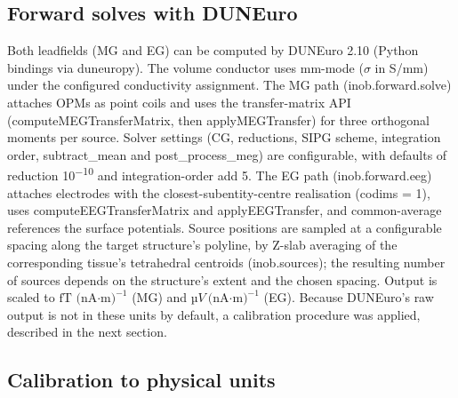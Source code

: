 \documentclass[11pt]{article}
\begin{document}
\subsection{Forward solves with
DUNEuro}\label{forward-solves-with-duneuro}

Both leadfields (MG and EG) can be computed by DUNEuro 2.10 (Python
bindings via duneuropy). The volume conductor uses mm-mode (\(\sigma\) in S/mm)
under the configured conductivity assignment. The MG path
(inob.forward.solve) attaches OPMs as point coils and uses the
transfer-matrix API (computeMEGTransferMatrix, then applyMEGTransfer)
for three orthogonal moments per source. Solver settings (CG,
reductions, SIPG scheme, integration order, subtract\_mean and
post\_process\_meg) are configurable, with defaults of reduction
10\textsuperscript{−10} and integration-order add 5. The EG path
(inob.forward.eeg) attaches electrodes with the closest-subentity-centre
realisation (codims = 1), uses computeEEGTransferMatrix and
applyEEGTransfer, and common-average references the surface potentials.
Source positions are sampled at a configurable spacing along the target
structure's polyline, by Z-slab averaging of the
corresponding tissue's tetrahedral centroids
(inob.sources); the resulting number of sources depends on the
structure's extent and the chosen spacing. Output is
scaled to \(\text{fT }\text{(nA·m)}^{- 1}\) (MG) and
\(µV\ \text{(nA·m)}^{- 1}\) (EG). Because DUNEuro's raw
output is not in these units by default, a calibration procedure was
applied, described in the next section.

\subsection{Calibration to physical
units}\label{calibration-to-physical-units}
\end{document}
